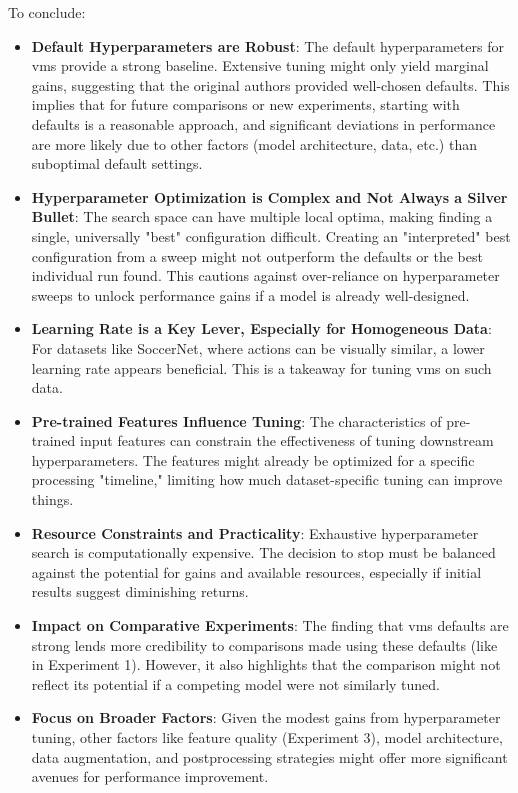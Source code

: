 To conclude:
\begin{itemize}
    \item \textbf{Default Hyperparameters are Robust}: The default hyperparameters for \acrshort{vms} provide a strong baseline. Extensive tuning might only yield marginal gains, suggesting that the original authors provided well-chosen defaults. This implies that for future comparisons or new experiments, starting with defaults is a reasonable approach, and significant deviations in performance are more likely due to other factors (model architecture, data, etc.) than suboptimal default settings.
    \item \textbf{Hyperparameter Optimization is Complex and Not Always a Silver Bullet}: The search space can have multiple local optima, making finding a single, universally "best" configuration difficult. Creating an "interpreted" best configuration from a sweep might not outperform the defaults or the best individual run found. This cautions against over-reliance on hyperparameter sweeps to unlock performance gains if a model is already well-designed.
    \item \textbf{Learning Rate is a Key Lever, Especially for Homogeneous Data}: For datasets like SoccerNet, where actions can be visually similar, a lower learning rate appears beneficial. This is a takeaway for tuning \acrshort{vms} on such data.
    \item \textbf{Pre-trained Features Influence Tuning}: The characteristics of pre-trained input features can constrain the effectiveness of tuning downstream hyperparameters. The features might already be optimized for a specific processing "timeline," limiting how much dataset-specific tuning can improve things.
    \item \textbf{Resource Constraints and Practicality}: Exhaustive hyperparameter search is computationally expensive. The decision to stop must be balanced against the potential for gains and available resources, especially if initial results suggest diminishing returns.
    \item \textbf{Impact on Comparative Experiments}: The finding that \acrshort{vms} defaults are strong lends more credibility to comparisons made using these defaults (like in Experiment 1). However, it also highlights that the comparison might not reflect its potential if a competing model were not similarly tuned.
    \item \textbf{Focus on Broader Factors}: Given the modest gains from hyperparameter tuning, other factors like feature quality (Experiment 3), model architecture, data augmentation, and postprocessing strategies might offer more significant avenues for performance improvement.
\end{itemize}


